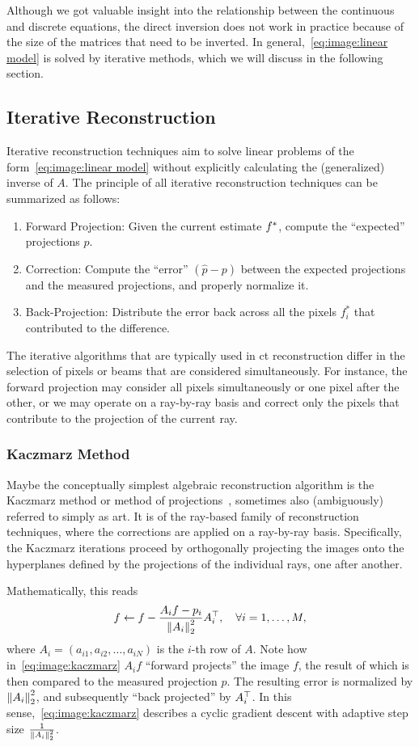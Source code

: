 \documentclass[../ml-ct.tex]{subfiles}
\begin{document}
Although we got valuable insight into the relationship between the continuous and discrete equations, the direct inversion does not work in practice because of the size of the matrices that need to be inverted.
In general,~\cref{eq:image:linear model} is solved by iterative methods, which we will discuss in the following section.
\subsection{Iterative Reconstruction}
Iterative reconstruction techniques aim to solve linear problems of the form~\cref{eq:image:linear model} without explicitly calculating the (generalized) inverse of \( A \).
The principle of all iterative reconstruction techniques can be summarized as follows:
\begin{enumerate}
	\item Forward Projection: Given the current estimate \( f^*_{\text{}} \), compute the \enquote{expected} projections \( \hat{p} \).
	\item Correction: Compute the \enquote{error} \( (\hat{p} - p) \) between the expected projections and the measured projections, and properly normalize it.
	\item Back-Projection: Distribute the error back across all the pixels \( f_i^* \) that contributed to the difference.
\end{enumerate}
The iterative algorithms that are typically used in \gls{ct} reconstruction differ in the selection of pixels or beams that are considered simultaneously.
For instance, the forward projection may consider all pixels simultaneously or one pixel after the other, or we may operate on a ray-by-ray basis and correct only the pixels that contribute to the projection of the current ray.
\subsubsection{Kaczmarz Method}
Maybe the conceptually simplest algebraic reconstruction algorithm is the Kaczmarz method or method of projections~\cite{kaczmarz_angenaeherte_1937}, sometimes also (ambiguously) referred to simply as \gls{art}.
It is of the ray-based family of reconstruction techniques, where the corrections are applied on a ray-by-ray basis.
Specifically, the Kaczmarz iterations proceed by orthogonally projecting the images onto the hyperplanes defined by the projections of the individual rays, one after another.

Mathematically, this reads
\begin{equation}
	f \leftarrow f - \frac{A_i f - p_i}{\norm{A_i}_2^2} A_i\tp,\quad \forall i = 1,\dotsc,M,%
	\label{eq:image:kaczmarz}
\end{equation}
where \( A_i = ( a_{i1}, a_{i2}, \dotsc, a_{iN}) \) is the \( i \)-th row of \( A \).
Note how in~\cref{eq:image:kaczmarz} \( A_i f \) \enquote{forward projects} the image \( f \), the result of which is then compared to the measured projection \( p \).
The resulting error is normalized by \( \left\lVert A_i\right\rVert_2^2 \), and subsequently \enquote{back projected} by \( A_i^\top \).
In this sense,~\cref{eq:image:kaczmarz} describes a cyclic gradient descent with adaptive step size \( \frac{1}{\left\lVert A_i\right\rVert_2^2} \).
\end{document}
